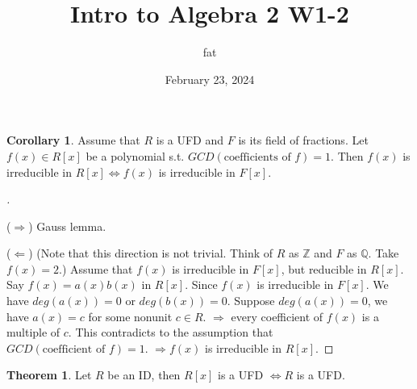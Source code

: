 \documentclass{article}
\title{Intro to Algebra 2 W1-2}
\author{fat}
\date{February 23, 2024}
\theoremstyle{definition}
\newtheorem{thm}{Theorem}
\newtheorem{cor}{Corollary}
\newenvironment{proofs}[1][\proofname]{%
  \begin{proof}[#1]$ $\par\nobreak\ignorespaces
}{%
  \end{proof}
}
\begin{document}
\maketitle
\thispagestyle{fancy}
\renewcommand{\footrulewidth}{0.4pt}
\cfoot{\thepage}
\renewcommand{\headrulewidth}{0.4pt}


\begin{cor}
  Assume that $R$ is a UFD and $F$ is its field of fractions. Let $f(x) \in R[x]$ be a polynomial s.t. $GCD(\text{coefficients of }f) = 1$. Then $f(x)$ is irreducible in $R[x] \Leftrightarrow f(x)$ is irreducible in $F[x]$. 
\end{cor}

\begin{proofs}
  ($\Rightarrow$) Gauss lemma. 
  \par ($\Leftarrow$) (Note that this direction is not trivial. Think of $R$ as $\mathbb{Z}$ and $F$ as $\mathbb{Q}$. Take $f(x) = 2$.) Assume that $f(x)$ is irreducible in $F[x]$, but reducible in $R[x]$. Say $f(x) = a(x) b(x)$ in $R[x]$. Since $f(x)$ is irreducible in $F[x]$. We have $deg(a(x)) = 0$ or $deg(b(x)) = 0$. Suppose $deg(a(x)) = 0$, we have $a(x) = c$ for some nonunit $c \in R$. $\Rightarrow$ every coefficient of $f(x)$ is a multiple of $c$. This contradicts to the assumption that $GCD(\text{coefficient of }f) = 1$. $\Rightarrow f(x)$ is irreducible in $R[x]$.  
  
\end{proofs}

\begin{thm}
  Let $R$ be an ID, then $R[x]$ is a UFD $\Leftrightarrow  R$ is a UFD. 
\end{thm}
\end{document}
